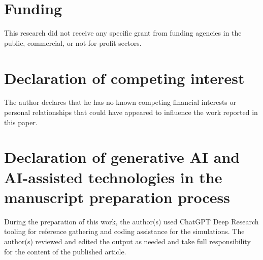 \documentclass[5p,times,twocolumn]{elsarticle}
\begin{document}
\section*{Funding}
This research did not receive any specific grant from funding agencies in
the public, commercial, or not-for-profit sectors.

\section*{Declaration of competing interest}
The author declares that he has no known competing financial interests or
personal relationships that could have appeared to influence the work
reported in this paper.

\section*{Declaration of generative AI and AI-assisted technologies in the manuscript preparation process}
During the preparation of this work, the author(s) used ChatGPT Deep Research tooling for reference gathering 
and coding assistance for the simulations. The author(s) reviewed and edited the output as needed and take 
full responsibility for the content of the published article. 



\end{document}

